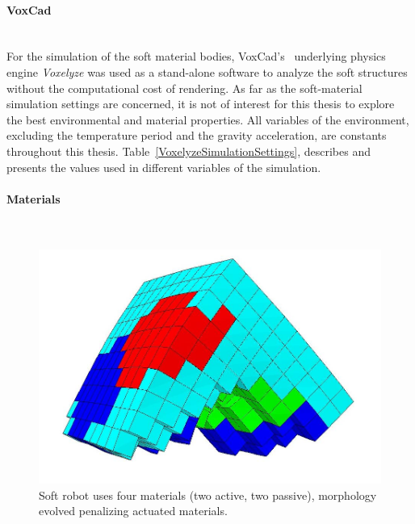 \paragraph*{VoxCad}~\\

For the simulation of the soft material bodies, VoxCad's~\citep{hiller2012dynamic} underlying physics engine \emph{Voxelyze} was used as a stand-alone software to analyze the soft structures without the computational cost of rendering. As far as the soft-material simulation settings are concerned, it is not of interest for this thesis to explore the best environmental and material properties. All variables of the environment, excluding the temperature period and the gravity acceleration, are constants throughout this thesis. Table~\ref{VoxelyzeSimulationSettings}, describes and presents the values used in different variables of the simulation.



\paragraph*{Materials}~\\

\begin{figure}
\centering
\includegraphics[height=0.2\textheight]{../Figures/Misc/allSoftMaterials.png}
\caption{Soft robot uses four materials (two active, two passive), morphology evolved penalizing actuated materials.}
\label{fig:allSoftMaterials}
\end{figure}

